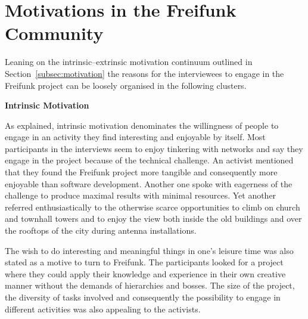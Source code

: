 \section{Motivations in the Freifunk Community}

\begin{comment}
\begin{itemize}
  \item is the focus of the paper;
  \item only pull up the foss motivations as comparison to underline similarities and differences with the foundings here
  \item general part of the questionnaire $\rightarrow$ cluster answers
  \item some graphs/tables on the specific questions
\end{itemize}
\end{comment}

Leaning on the intrinsic--extrinsic motivation continuum outlined in Section~\ref{subsec:motivation} the reasons for the interviewees to engage in the Freifunk project can be loosely organised in the following clusters.

\textbf{Intrinsic Motivation}

As explained, intrinsic motivation denominates the willingness of people to engage in an activity they find interesting and enjoyable by itself.
Most participants in the interviews seem to enjoy tinkering with networks and say they engage in the project because of the technical challenge.
An activist mentioned that they found the Freifunk project more tangible and consequently more enjoyable than software development.
Another one spoke with eagerness of the challenge to produce maximal results with minimal resources.
Yet another referred enthusiastically to the otherwise scarce opportunities to climb on church and townhall towers and to enjoy the view both inside the old buildings and over the rooftops of the city during antenna installations.

The wish to do interesting and meaningful things in one's leisure time was also stated as a motive to turn to Freifunk.
The participants looked for a project where they could apply their knowledge and experience in their own creative manner without the demands of hierarchies and bosses.
The size of the project, the diversity of tasks involved and consequently the possibility to engage in different activities was also appealing to the activists.

